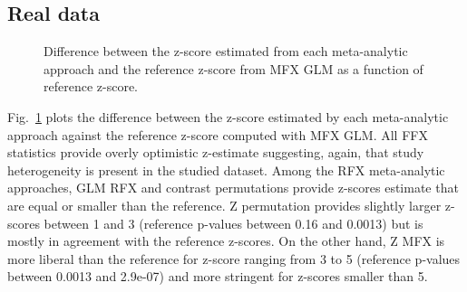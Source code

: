 \documentclass[preprint]{elsarticle}
\begin{document}
\subsection{Real data}




\begin{figure}[t]
	\centering
	\caption{Difference between the z-score estimated from each meta-analytic approach and the reference z-score from MFX GLM as a function of reference z-score.}
	\label{fig_realdata}
\end{figure}


Fig.~\ref{fig_realdata} plots the difference between the z-score estimated by each meta-analytic approach against the reference z-score computed with MFX GLM. All FFX statistics provide overly optimistic z-estimate suggesting, again, that study heterogeneity is present in the studied dataset.
Among the RFX meta-analytic approaches, GLM RFX and contrast permutations provide z-scores estimate that are equal or smaller than the reference. Z permutation provides slightly larger z-scores between 1 and 3 (reference p-values between 0.16 and 0.0013) but is mostly in agreement with the reference z-scores. On the other hand, Z MFX is more liberal than the reference for z-score ranging from 3 to 5 (reference p-values between 0.0013 and 2.9e-07) and more stringent for z-scores smaller than 5.

\end{document}
